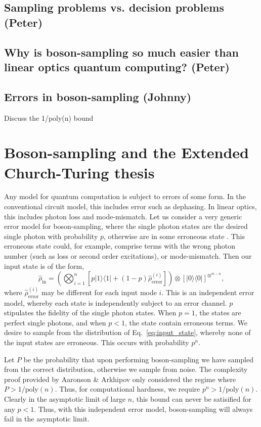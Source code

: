 \documentclass[aps,pra,twocolumn,amsmath,amssymb,nofootinbib,superscriptaddress]{revtex4}
\newcommand{\bra}[1]{\langle#1|}
\newcommand{\ket}[1]{|#1\rangle}
\begin{document}
\subsection{Sampling problems vs. decision problems (Peter)}

\subsection{Why is boson-sampling so much easier than linear optics quantum computing? (Peter)}

\subsection{Errors in boson-sampling (Johnny)}
Discuss the 1/poly(n) bound

\section{Boson-sampling and the Extended Church-Turing thesis}

Any model for quantum computation is subject to errors of some form. In the conventional circuit model, this includes error such as dephasing. In linear optics, this includes photon loss and mode-mismatch. Let us consider a very generic error model for boson-sampling, where the single photon states are the desired single photon with probability $p$, otherwise are in some erroneous state \cite{bib:BSECT}. This erroneous state could, for example, comprise terms with the wrong photon number (such as loss or second order excitations), or mode-mismatch. Then our input state is of the form,
\begin{equation}
\hat\rho_\mathrm{in} =\left(\bigotimes_{i=1}^n[p\ket{1}\bra{1} + (1-p)\hat\rho_\mathrm{error}^{(i)}]\right) \otimes [\ket{0}\bra{0}]^{\otimes^{m-n}},
\end{equation}
where \mbox{$\hat\rho_\mathrm{error}^{(i)}$} may be different for each input mode $i$. This is an independent error model, whereby each state is independently subject to an error channel. $p$ stipulates the fidelity of the single photon states. When \mbox{$p=1$}, the states are perfect single photons, and when \mbox{$p<1$}, the state contain erroneous terms. We desire to sample from the distribution of Eq.~\ref{eq:input_state}, whereby none of the input states are erroneous. This occurs with probability $p^n$.

Let $P$ be the probability that upon performing boson-sampling we have sampled from the correct distribution, otherwise we sample from noise. The complexity proof provided by Aaronson \& Arkhipov only considered the regime where \mbox{$P>1/\mathrm{poly}(n)$}. Thus, for computational hardness, we require \mbox{$p^n > 1/\mathrm{poly}(n)$}. Clearly in the asymptotic limit of large $n$, this bound can never be satisified for any $p<1$. Thus, with this independent error model, boson-sampling will always fail in the asymptotic limit.
\end{document}
